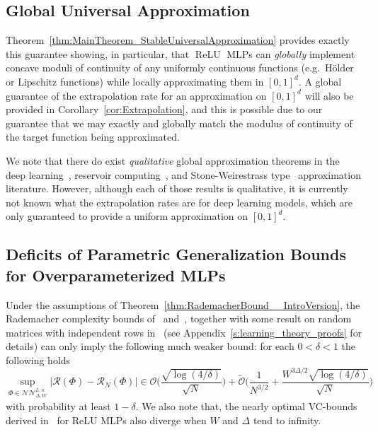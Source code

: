 \documentclass{article}
\numberwithin{equation}{section}
\theoremstyle{definition}
\begin{document}
\subsection{Global Universal Approximation}
\label{s:Related__ss:GLobalApproximation}
Theorem~\ref{thm:MainTheorem_StableUniversalApproximation} provides exactly this guarantee showing, in particular, that $\operatorname{ReLU}$ MLPs can \textit{globally} implement concave moduli of continuity of any uniformly continuous functions (e.g.\ H\"{o}lder or Lipschitz functions) while locally approximating them in $[0,1]^d$.  A global guarantee of the extrapolation rate for an approximation on $[0,1]^d$ will also be provided in Corollary~\ref{cor:Extrapolation}, and this is possible due to our guarantee that we may exactly and globally match the modulus of continuity of the target function being approximated.

We note that there do exist \textit{qualitative} global approximation theorems in the deep learning~\cite{cuchiero2023global}, reservoir computing~\cite{LuydmillaJP_UAT_2018}, and Stone-Weirestrass type~\cite{giles1971generalization} approximation literature.  However, although each of those results is qualitative, it is currently not known what the extrapolation rates are for deep learning models, which are only guaranteed to provide a uniform approximation on $[0,1]^d$.






\subsection{Deficits of Parametric Generalization Bounds for Overparameterized MLPs}
Under the assumptions of Theorem~\ref{thm:RademacherBound__IntroVersion}, the Rademacher complexity bounds of~\citep[Theorems 8 and 12]{bartlett2002rademacher} and~\cite{bartlett2017spectrally}, together with some result on random matrices with independent rows in~\citep[Theorem 4.6.1]{Vershynin_HighDimensionalProbBook_2018} (see Appendix~\ref{s:learning_theory_proofs} for details) can only imply the following much weaker bound: for each $0<\delta<1$ the following holds
\begin{equation}
\label{eq:RademacherBound}
    \sup_{\Phi\in \mathcal{NN}_{\Delta,W}^{L,n}} \big|\mathcal{R}(\Phi)-\mathcal{R}_N(\Phi)\big|
\in 
    \mathcal{O}\Big(
        \frac{\sqrt{\log(4/\delta)}}{\sqrt{N}}
    \Big)
    +
    \tilde{\mathcal{O}}\biggl(
            \frac{1}{N^{3/2}}
        +
            \frac{
                W^{3\Delta/2}
                \sqrt{\log(4/\delta)}
            }{\sqrt{N}}
        \biggr)
\end{equation}
with probability at least $1-\delta$.
We also note that, the nearly optimal VC-bounds derived in~\cite{BartlettHarveyChristopherMehrabian_VCDimReLUMLPs_JMLR_2019} for ReLU MLPs also diverge when $W$ and $\Delta$ tend to infinity.  
\end{document}
